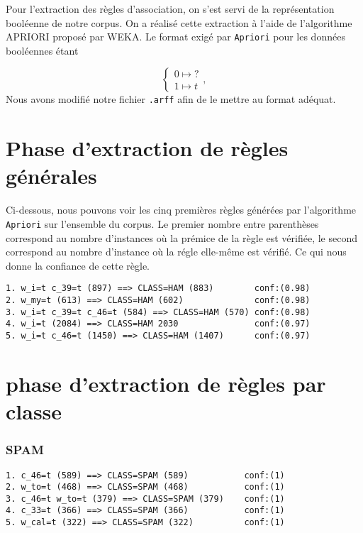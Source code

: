 
Pour l'extraction des règles d'association, on s'est servi de la représentation booléenne de notre corpus. On a réalisé cette extraction à l'aide de l'algorithme APRIORI proposé par WEKA. Le format exigé par \texttt{Apriori} pour les données booléennes étant 

\begin{displaymath}
\begin{cases}
      0 \mapsto ? \\
      1 \mapsto t
\end{cases},
\end{displaymath} 
Nous avons modifié notre fichier \texttt{.arff} afin de le mettre au format adéquat. 



\section{Phase d'extraction de règles générales}

Ci-dessous, nous pouvons voir les cinq premières règles générées par l'algorithme \texttt{Apriori} sur l'ensemble du corpus. Le premier nombre entre parenthèses correspond au nombre d'instances où la prémice de la règle est vérifiée, le second correspond au nombre d'instance où la régle elle-même est vérifié. Ce qui nous donne la confiance de cette règle. 

\begin{verbatim}
1. w_i=t c_39=t (897) ==> CLASS=HAM (883)        conf:(0.98)
2. w_my=t (613) ==> CLASS=HAM (602)              conf:(0.98)
3. w_i=t c_39=t c_46=t (584) ==> CLASS=HAM (570) conf:(0.98)
4. w_i=t (2084) ==> CLASS=HAM 2030               conf:(0.97)
5. w_i=t c_46=t (1450) ==> CLASS=HAM (1407)      conf:(0.97)
\end{verbatim}

\section{phase d'extraction de règles par classe}

\subsubsection{SPAM}

\begin{verbatim}
1. c_46=t (589) ==> CLASS=SPAM (589)           conf:(1)
2. w_to=t (468) ==> CLASS=SPAM (468)           conf:(1)
3. c_46=t w_to=t (379) ==> CLASS=SPAM (379)    conf:(1)
4. c_33=t (366) ==> CLASS=SPAM (366)           conf:(1)
5. w_cal=t (322) ==> CLASS=SPAM (322)          conf:(1)
\end{verbatim}

